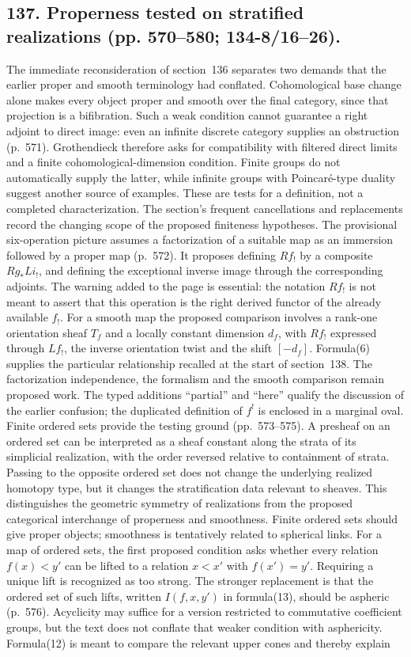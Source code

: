 \documentclass[10pt,oneside]{book}
\begin{document}
\subsection*{137. Properness tested on stratified realizations (pp. 570--580; 134-8/16--26).}
The immediate reconsideration of section~136 separates two demands that the earlier proper and smooth terminology had conflated. Cohomological base change alone makes every object proper and smooth over the final category, since that projection is a bifibration. Such a weak condition cannot guarantee a right adjoint to direct image: even an infinite discrete category supplies an obstruction (p.~571). Grothendieck therefore asks for compatibility with filtered direct limits and a finite cohomological-dimension condition. Finite groups do not automatically supply the latter, while infinite groups with Poincar\'e-type duality suggest another source of examples. These are tests for a definition, not a completed characterization. The section's frequent cancellations and replacements record the changing scope of the proposed finiteness hypotheses. The provisional six-operation picture assumes a factorization of a suitable map as an immersion followed by a proper map (p.~572). It proposes defining $Rf_!$ by a composite $Rg_*Li_!$, and defining the exceptional inverse image through the corresponding adjoints. The warning added to the page is essential: the notation $Rf_!$ is not meant to assert that this operation is the right derived functor of the already available $f_!$. For a smooth map the proposed comparison involves a rank-one orientation sheaf $T_f$ and a locally constant dimension $d_f$, with $Rf_!$ expressed through $Lf_!$, the inverse orientation twist and the shift $[-d_f]$. Formula(6) supplies the particular relationship recalled at the start of section~138. The factorization independence, the formalism and the smooth comparison remain proposed work. The typed additions ``partial'' and ``here'' qualify the discussion of the earlier confusion; the duplicated definition of $f^!$ is enclosed in a marginal oval. Finite ordered sets provide the testing ground (pp.~573--575). A presheaf on an ordered set can be interpreted as a sheaf constant along the strata of its simplicial realization, with the order reversed relative to containment of strata. Passing to the opposite ordered set does not change the underlying realized homotopy type, but it changes the stratification data relevant to sheaves. This distinguishes the geometric symmetry of realizations from the proposed categorical interchange of properness and smoothness. Finite ordered sets should give proper objects; smoothness is tentatively related to spherical links. For a map of ordered sets, the first proposed condition asks whether every relation $f(x)<y'$ can be lifted to a relation $x<x'$ with $f(x')=y'$. Requiring a unique lift is recognized as too strong. The stronger replacement is that the ordered set of such lifts, written $I(f,x,y')$ in formula(13), should be aspheric (p.~576). Acyclicity may suffice for a version restricted to commutative coefficient groups, but the text does not conflate that weaker condition with asphericity. Formula(12) is meant to compare the relevant upper cones and thereby explain 
\end{document}
